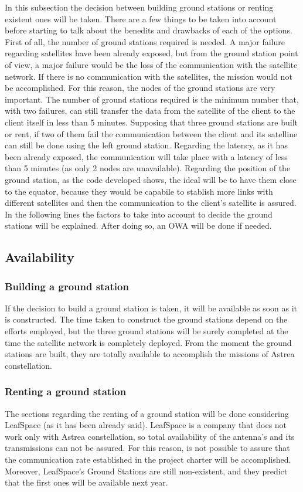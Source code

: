 In this subsection the decision between building ground stations or renting existent ones will be taken. There are a few things to be taken into account before starting to talk about the benedits and drawbacks of each of the options. First of all, the number of ground stations required is needed. A major failure regarding satellites have been already exposed, but from the ground station point of view, a major failure would be the loss of the communication with the satellite network. If there is no communication with the satellites, the mission would not be accomplished. For this reason, the nodes of the ground stations are very important. The number of ground stations required is the minimum number that, with two failures, can still transfer the data from the satellite of the client to the client itself in less than 5 minutes. Supposing that three ground stations are built or rent, if two of them fail the communication between the client and its satelline can still be done using the left ground station. Regarding the latency, as it has been already exposed, the communication will take place with a latency of less than 5 minutes (as only 2 nodes are unavailable). Regarding the position of the ground station, as the code developed shows, the ideal will be to have them close to the equator, because they would be capabile to stablish more links with different satellites and then the communication to the client's satellite is assured. In the following lines the factors to take into account to decide the ground stations will be explained. After doing so, an OWA will be done if needed.
\subsection{Availability}
\subsubsection{Building a ground station}
If the decision to build a ground station is taken, it will be available as soon as it is constructed. The time taken to construct the ground stations depend on the efforts employed, but the three ground stations will be surely completed at the time the satellite network is completely deployed. From the moment the ground stations are built, they are totally available to accomplish the missions of Astrea constellation.
\subsubsection{Renting a ground station}
The sections regarding the renting of a ground station will be done considering LeafSpace (as it has been already said). LeafSpace is a company that does not work only with Astrea constellation, so total availability of the antenna's and its transmissions can not be assured. For this reason, is not possible to assure that the communication rate established in the project charter will be accomplished. Moreover, LeafSpace's Ground Stations are still non-existent, and they predict that the first ones will be available next year.
